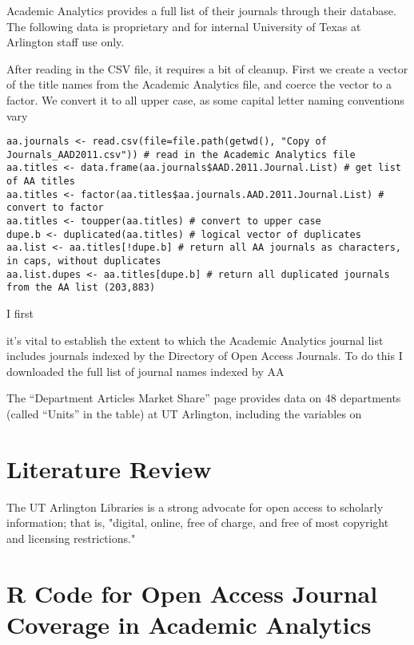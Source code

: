 \documentclass{article}
\begin{document}


Academic Analytics provides a full list of their journals through their database. 
The following data is proprietary and for internal University of Texas at Arlington staff use only.


After reading in the CSV file, it requires a bit of cleanup. First we create a vector of the title names from the Academic Analytics file, and coerce the vector to a factor. We convert it to all upper case, as some capital letter naming conventions vary 

\begin{lstlisting}
aa.journals <- read.csv(file=file.path(getwd(), "Copy of Journals_AAD2011.csv")) # read in the Academic Analytics file
aa.titles <- data.frame(aa.journals$AAD.2011.Journal.List) # get list of AA titles
aa.titles <- factor(aa.titles$aa.journals.AAD.2011.Journal.List) # convert to factor
aa.titles <- toupper(aa.titles) # convert to upper case
dupe.b <- duplicated(aa.titles) # logical vector of duplicates
aa.list <- aa.titles[!dupe.b] # return all AA journals as characters, in caps, without duplicates
aa.list.dupes <- aa.titles[dupe.b] # return all duplicated journals from the AA list (203,883)
\end{lstlisting}

I first 



it's vital to establish the extent to which the Academic Analytics journal list includes journals indexed by the Directory of Open Access Journals. To do this I downloaded the full list of journal names indexed by AA





The “Department Articles Market Share” page provides data on 48 departments (called “Units” in the table) at UT Arlington, including the variables on 





\section{Literature Review}
The UT Arlington Libraries is a strong advocate for open access to scholarly information; that is, "digital, online, free of charge, and free of most copyright and licensing restrictions."  \cite{RefWorks:102}













\appendix
\section{R Code for Open Access Journal Coverage in Academic Analytics}
\end{document}
